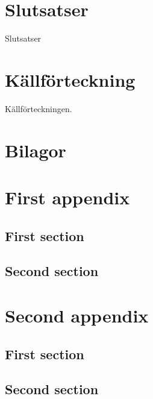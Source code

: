 \documentclass{kththesis}
\begin{document}
\chapter{Slutsatser}
Slutsatser
\blindtext

\chapter{Källförteckning}
Källförteckningen.


\chapter{Bilagor}

\begin{appendices}
  \chapter{First appendix}
  \section{First section}
  \section{Second section}

  \chapter{Second appendix}
  \section{First section}
  \section{Second section}
\end{appendices}

\end{document}

